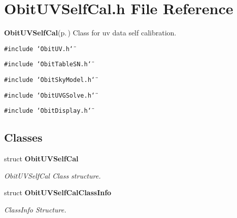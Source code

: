 \section{Obit\-UVSelf\-Cal.h File Reference}
\label{ObitUVSelfCal_8h}
{\bf Obit\-UVSelf\-Cal}{\rm (p.\,\pageref{structObitUVSelfCal})} Class for uv data self calibration. 

{\tt \#include \char`\"{}Obit\-UV.h\char`\"{}}\par
{\tt \#include \char`\"{}Obit\-Table\-SN.h\char`\"{}}\par
{\tt \#include \char`\"{}Obit\-Sky\-Model.h\char`\"{}}\par
{\tt \#include \char`\"{}Obit\-UVGSolve.h\char`\"{}}\par
{\tt \#include \char`\"{}Obit\-Display.h\char`\"{}}\par
\subsection*{Classes}
\begin{CompactItemize}
\item 
struct {\bf Obit\-UVSelf\-Cal}
\begin{CompactList}\small\item\em Obit\-UVSelf\-Cal Class structure. \item\end{CompactList}\item 
struct {\bf Obit\-UVSelf\-Cal\-Class\-Info}
\begin{CompactList}\small\item\em Class\-Info Structure. \item\end{CompactList}\end{CompactItemize}

